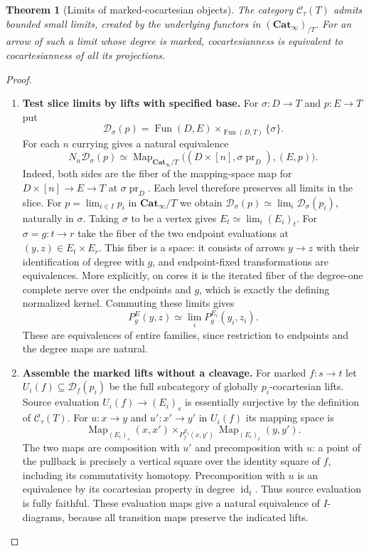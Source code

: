 \documentclass[oneside]{article}
\theoremstyle{plain}
\newtheorem{theorem}{Theorem}[section]
\theoremstyle{definition}
\theoremstyle{remark}
\newcommand{\Cat}{\mathbf{Cat}_{\infty}}
\newcommand{\Fun}{\operatorname{Fun}}
\newcommand{\Map}{\operatorname{Map}}
\newcommand{\id}{\operatorname{id}}
\begin{document}
\begin{theorem}[Limits of marked-cocartesian objects]
\label{thm:marked-cocart-limits}
The category $\mathscr C_\tau(T)$ admits bounded small limits, created
by the underlying functors in $(\Cat)_{/T}$. For an arrow of such a
limit whose degree is marked, cocartesianness is equivalent to
cocartesianness of all its projections.
\end{theorem}
\begin{proof}
\leavevmode
\begin{enumerate}
\item \textbf{Test slice limits by lifts with specified base.}
For $\sigma:D\to T$ and $p:E\to T$ put
\[
 \mathcal D_\sigma(p)=\Fun(D,E)\times_{\Fun(D,T)}\{\sigma\}.
\]
For each $n$ currying gives a natural equivalence
\[
 N_n\mathcal D_\sigma(p)\simeq
 \Map_{\Cat/T}\bigl((D\times[n],\sigma\operatorname{pr}_D),(E,p)\bigr).
\]
Indeed, both sides are the fiber of the mapping-space map for
$D\times[n]\to E\to T$ at $\sigma\operatorname{pr}_D$.
Each level therefore preserves all limits in the slice. For
$p=\lim_{i\in I}p_i$ in $\Cat/T$ we obtain
$\mathcal D_\sigma(p)\simeq\lim_i\mathcal D_\sigma(p_i)$, naturally
in $\sigma$. Taking $\sigma$ to be a vertex gives
$E_t\simeq\lim_i(E_i)_t$. For $\sigma=g:t\to r$ take the fiber of
the two endpoint evaluations at $(y,z)\in E_t\times E_r$.
This fiber is a space: it consists of arrows $y\to z$ with their
identification of degree with $g$, and endpoint-fixed transformations
are equivalences. More explicitly, on cores it is the iterated fiber
of the degree-one complete nerve over the endpoints and $g$, which
is exactly the defining normalized kernel. Commuting these limits gives
\[
 P_g^E(y,z)\simeq\lim_i P_g^{E_i}(y_i,z_i).
 \tag*{$(*)$}
\]
These are equivalences of entire families, since restriction to
endpoints and the degree maps are natural.

\item \textbf{Assemble the marked lifts without a cleavage.}
For marked $f:s\to t$ let $U_i(f)\subseteq\mathcal D_f(p_i)$ be
the full subcategory of globally $p_i$-cocartesian lifts. Source
evaluation $U_i(f)\to(E_i)_s$ is essentially surjective by the
definition of $\mathscr C_\tau(T)$. For $u:x\to y$ and $u':x'\to y'$
in $U_i(f)$ its mapping space is
\[
 \Map_{(E_i)_s}(x,x')\times_{P_f^{E_i}(x,y')}
                     \Map_{(E_i)_t}(y,y').
\]
The two maps are composition with $u'$ and precomposition with $u$:
a point of the pullback is precisely a vertical square over the
identity square of $f$, including its commutativity homotopy.
Precomposition with $u$ is an equivalence by its cocartesian
property in degree $\id_t$. Thus source evaluation is fully faithful.
These evaluation maps give a natural equivalence of $I$-diagrams,
because all transition maps preserve the indicated lifts.


\end{enumerate}
\end{proof}
\end{document}
